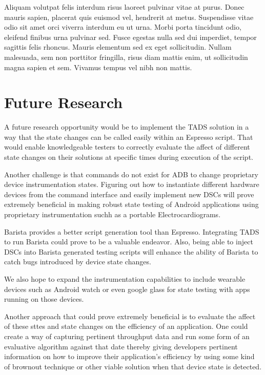 Aliquam volutpat felis interdum risus laoreet pulvinar vitae at purus. Donec mauris sapien, placerat quis euismod vel, hendrerit at metus. Suspendisse vitae odio sit amet orci viverra interdum eu ut urna. Morbi porta tincidunt odio, eleifend finibus urna pulvinar sed. Fusce egestas nulla sed dui imperdiet, tempor sagittis felis rhoncus. Mauris elementum sed ex eget sollicitudin. Nullam malesuada, sem non porttitor fringilla, risus diam mattis enim, ut sollicitudin magna sapien et sem. Vivamus tempus vel nibh non mattis.

\section{Future Research}
A future research opportunity would be to implement the TADS solution in a way that the state changes can be called easily within an Espresso script.  That would enable knowledgeable testers to correctly evaluate the affect of different state changes on their solutions at specific times during execution of the script.   

Another challenge is that commands do not exist for ADB to change proprietary device instrumentation states.  Figuring out how to instantiate different hardware devices from the command interface and easily implement new DSCs will prove extremely beneficial in making robust state testing of Android applications using proprietary instrumentation suchh as a portable Electrocardiograms.  

Barista \cite{7927971} provides a better script generation tool than Espresso.  Integrating TADS to run Barista could prove to be a valuable endeavor.  Also, being able to inject DSCs into Barista generated testing scripts will enhance the ability of Barista to catch bugs introduced by device state changes.  

We also hope to expand the instrumentation capabilities to include wearable devices such as Android watch or even google glass for state testing with apps running on those devices.

Another approach that could prove extremely beneficial is to evaluate the affect of these sttes and state changes on the efficiency of an application. One could create a way of capturing pertinent throughput data and run some form of an evaluative algorithm against that date thereby giving developers pertinent information on how to improve their application's efficiency by using some kind of brownout technique \cite{Klein:2014:BBM:2568225.2568227} or other viable solution when that device state is detected. 

